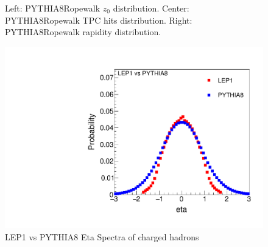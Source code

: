 \begin{figure}[H]
\centering
{}\hfill
{}\hfill %
\hfill %
\caption{Left: PYTHIA8Ropewalk $z_0$ distribution. Center: PYTHIA8Ropewalk TPC hits distribution. Right: PYTHIA8Ropewalk rapidity distribution.}
\end{figure}


\begin{figure}[H]
\begin{center}
\includegraphics[width=.45\textwidth]{images/DataQualityCheck/eta_LEP1_PYTHIA8.pdf}
\caption{LEP1 vs PYTHIA8 Eta Spectra of charged hadrons}
\label{fig:figure10} 
\end{center}
\end{figure}

